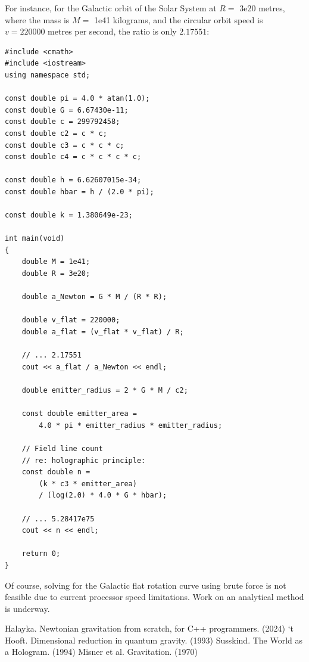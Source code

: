 \documentclass[12pt]{article}
\begin{document}
For instance, for the Galactic orbit of the Solar System at $R = $ 3e20 metres, where the mass is $M = $ 1e41 kilograms, and the circular orbit speed is $v = 220000$ metres per second, the ratio is only $2.17551$:
\begin{lstlisting}
#include <cmath>
#include <iostream>
using namespace std;

const double pi = 4.0 * atan(1.0);
const double G = 6.67430e-11;
const double c = 299792458;
const double c2 = c * c;
const double c3 = c * c * c;
const double c4 = c * c * c * c;

const double h = 6.62607015e-34;
const double hbar = h / (2.0 * pi);

const double k = 1.380649e-23;

int main(void)
{
	double M = 1e41;
	double R = 3e20;

	double a_Newton = G * M / (R * R);

	double v_flat = 220000;
	double a_flat = (v_flat * v_flat) / R;

	// ... 2.17551
	cout << a_flat / a_Newton << endl;

	double emitter_radius = 2 * G * M / c2;

	const double emitter_area =
		4.0 * pi * emitter_radius * emitter_radius;

	// Field line count
	// re: holographic principle:
	const double n =
		(k * c3 * emitter_area)
		/ (log(2.0) * 4.0 * G * hbar);

	// ... 5.28417e75
	cout << n << endl;

	return 0;
}
\end{lstlisting}
Of course, solving for the Galactic flat rotation curve using brute force is not feasible due to current processor speed limitations.
Work on an analytical method is underway.

\begin{thebibliography}{9}

 Halayka. Newtonian gravitation from scratch, for C++ programmers. (2024)
 `t Hooft. Dimensional reduction in quantum gravity. (1993)
 Susskind. The World as a Hologram. (1994)
 Misner et al. Gravitation. (1970)

\end{thebibliography}



\pagebreak
\end{document}
